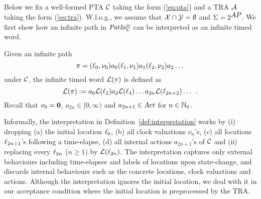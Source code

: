 Below we fix a well-formed PTA $\mathcal{C}$ taking the form (\ref{eq:pta}) and a TRA $\mathcal{A}$ taking the form (\ref{eq:tra}).
W.l.o.g., we assume that $\mathcal{X}\cap\mathcal{Y}=\emptyset$ and $\Sigma=2^{\mbox{\sl AP}}$.
We first show how an infinite path in $\mbox{\sl Paths}^\omega_{\mathcal{C}}$ can be interpreted as an infinite timed word.
%
\begin{definition}\label{def:interpretation}
Given an infinite path
\[
    \pi
        =
            (\ell_0,\nu_0)
            a_0
            (\ell_1,\nu_1)
            a_1
            (\ell_2,\nu_2)a_2
            \dots
\]
under $\mathcal{C}$, the infinite timed word $\mathcal{L}(\pi)$
is defined as
\[
\mathcal{L}(\pi):=a_0\mathcal{L}(\ell_2)a_2\mathcal{L}(\ell_4)\dots a_{2n}\mathcal{L}(\ell_{2n+2}) \dots\enskip.
\]
Recall that $\nu_0=\mathbf{0}$, $a_{2n}\in [0,\infty)$ and $a_{2n+1}\in\mbox{\sl Act}$ for $n\in\mathbb{N}_0$.
\end{definition}
%
\begin{remark}
Informally, the interpretation in Definition~\ref{def:interpretation} works
by (i) dropping (a) the initial location $\ell_0$, (b) all clock valuations $\nu_n$'s,
(c) all locations $\ell_{2n+1}$'s following a time-elapse,
(d) all internal actions $a_{2n+1}$'s of $\mathcal{C}$ and (ii) replacing every $\ell_{2n}$ ($n\ge 1$) by $\mathcal{L}(\ell_{2n})$.
The interpretation captures only external behaviours including time-elapses and labels of locations upon state-change, and discards internal behaviours such as the concrete locations, clock valuations and actions.
Although the interpretation ignores the initial location,
we deal with it in our acceptance condition where the initial location is preprocessed by the TRA.
\end{remark}
%
